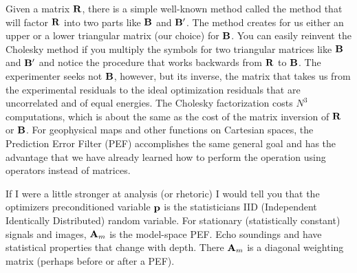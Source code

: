\par
Given a matrix $\bold R$,
there is a simple well-known method
called the  method that will factor $\bold R$
into two parts like $\bold B$ and $\bold B'$.
The method creates for us either an upper or a lower triangular
matrix (our choice) for $\bold B$.
You can easily reinvent the Cholesky method
if you multiply
the symbols for two triangular matrices like
$\bold B$ and $\bold B'$ and notice the procedure that
works backwards from $\bold R$ to $\bold B$.
The experimenter seeks not $\bold B$, however, but its inverse,
the matrix that takes us from the experimental residuals
to the ideal optimization residuals
that are uncorrelated and of equal energies.
The Cholesky factorization costs $N^3$ computations,
which is about the same as the cost of the matrix inversion
of $\bold R$ or $\bold B$.
For geophysical maps and other functions on Cartesian spaces,
the Prediction Error Filter (PEF) accomplishes the same
general goal and has the advantage that we have already
learned how to perform the operation using operators
instead of matrices.
\par
{}
%
\par
If I were a little stronger at analysis (or rhetoric)
I would tell you that
the optimizers preconditioned variable $\bold p$
is the statisticians IID (Independent Identically Distributed) random variable.
For stationary (statistically constant) signals and images,
$\bold A_m$
is the model-space PEF.
Echo soundings and
have statistical properties
that change with depth.
There $\bold A_m$
is a diagonal weighting matrix
(perhaps before or after a PEF).



